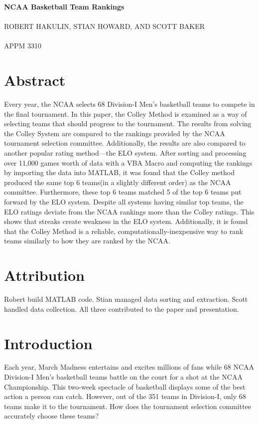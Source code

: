 \documentclass{article}
\begin{document}
\begin{center}
\textbf{\Large{NCAA Basketball Team Rankings}}\\~\\
ROBERT HAKULIN, STIAN HOWARD, {\tiny{AND}} SCOTT BAKER\\~\\
APPM 3310
\end{center}
\section{Abstract}
Every year, the NCAA selects 68 Division-I Men's basketball teams to compete in the final tournament. In this paper, the Colley Method is examined as a way of selecting teams that should progress to the tournament. The results from solving the Colley System are compared to the rankings provided by the NCAA tournament selection committee. Additionally, the results are also compared to another popular rating method---the ELO system. After sorting and processing over 11,000 games worth of data with a VBA Macro and computing the rankings by importing the data into MATLAB, it was found that the Colley method produced the same top 6 teams(in a slightly different order) as the NCAA committee. Furthermore,  these top 6 teams matched 5 of the top 6 teams put forward by the ELO system. Despite all systems having similar top teams, the ELO ratings deviate from the NCAA rankings more than the Colley ratings. This shows that streaks create weakness in the ELO system. Additionally, it is found that the Colley Method is a reliable, computationally-inexpensive way to rank teams similarly to how they are ranked by the NCAA.

\section{Attribution}
Robert build MATLAB code.
Stian managed data sorting and extraction.
Scott handled data collection. All three contributed to the paper and presentation.
\section{Introduction}
Each year, March Madness entertains and excites millions of fans while 68 NCAA Division-I Men's basketball teams battle on the court for a shot at the NCAA Championship. This two-week spectacle of basketball displays some of the best action a person can catch. However, out of the 351 teams in Division-I, only 68 teams make it to the tournament. How does the tournament selection committee accurately choose these teams?
\end{document}
